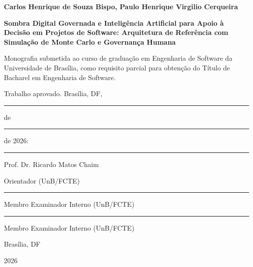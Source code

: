 \documentclass[12pt,openany,oneside,a4paper,english,brazilian,sumario=tradicional]{abntex2}
\begin{document}
\begin{center}
  {\bfseries Carlos Henrique de Souza Bispo, Paulo Henrique Virgilio Cerqueira}\par
  \vspace{1cm}
  {\bfseries Sombra Digital Governada e Inteligência Artificial para Apoio à Decisão em Projetos de Software: Arquitetura de Referência com Simulação de Monte Carlo e Governança Humana}\par
  \vspace{1cm}
  \begin{flushright}
  \begin{minipage}{0.55\textwidth}
  \small Monografia submetida ao curso de graduação em Engenharia de Software da Universidade de Brasília, como requisito parcial para obtenção do Título de Bacharel em Engenharia de Software.
  \end{minipage}
  \end{flushright}
  \vspace{1cm}
  Trabalho aprovado. Brasília, DF, \rule{1.2cm}{0.4pt} de \rule{3.8cm}{0.4pt} de 2026:\par
  \vspace{1.8cm}
  \rule{9cm}{0.4pt}\par Prof. Dr. Ricardo Matos Chaim\par Orientador (UnB/FCTE)\par
  \vspace{1.2cm}
  \rule{9cm}{0.4pt}\par Membro Examinador Interno (UnB/FCTE)\par
  \vspace{1.2cm}
  \rule{9cm}{0.4pt}\par Membro Examinador Interno (UnB/FCTE)\par
  \vfill
  Brasília, DF\par 2026
\end{center}
\clearpage
\end{document}

